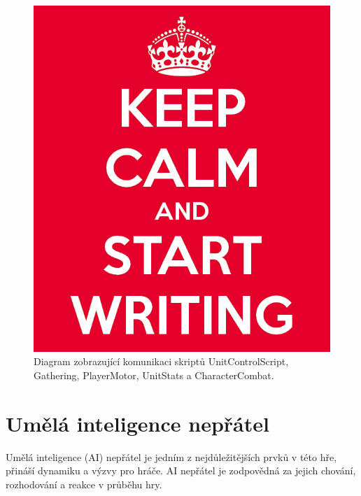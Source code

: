 \begin{figure}[H]
	\centering
	\includegraphics[scale=0.55]{obrazky-figures/keep-calm.png}
	\caption{Diagram zobrazující komunikaci skriptů UnitControlScript, Gathering, PlayerMotor, UnitStats a CharacterCombat.}
	\label{UnitControlRelation}
\end{figure}

\section{Umělá inteligence nepřátel}
Umělá inteligence (AI) nepřátel je jedním z nejdůležitějších prvků v této hře, přináší dynamiku a výzvy pro hráče. AI nepřátel je zodpovědná za jejich chování, rozhodování a reakce v průběhu hry. 

